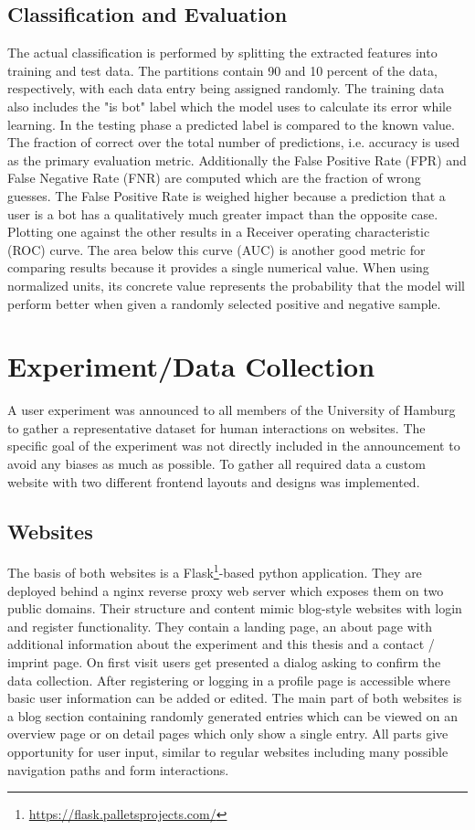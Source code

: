 \documentclass[
    fontsize=12pt,
    headings=small,
    parskip=half,           %
    bibliography=totoc,
    numbers=noenddot,       %
    open=any,               %
    final                   %
]{scrreprt}
\begin{document}
\subsection{Classification and Evaluation}

The actual classification is performed by splitting the extracted features into training and test data. The partitions contain 90 and 10 percent of the data, respectively, with each data entry being assigned randomly. The training data also includes the "is bot" label which the model uses to calculate its error while learning. In the testing phase a predicted label is compared to the known value. The fraction of correct over the total number of predictions, i.e. accuracy is used as the primary evaluation metric. Additionally the False Positive Rate (FPR) and False Negative Rate (FNR) are computed which are the fraction of wrong guesses. The False Positive Rate is weighed higher because a prediction that a user is a bot has a qualitatively much greater impact than the opposite case. Plotting one against the other results in a Receiver operating characteristic (ROC) curve. The area below this curve (AUC) is another good metric for comparing results because it provides a single numerical value. When using normalized units, its concrete value represents the probability that the model will perform better when given a randomly selected positive and negative sample.\cite{FAWCETT2006861}


\section{Experiment/Data Collection}

A user experiment was announced to all members of the University of Hamburg to gather a representative dataset for human interactions on websites. The specific goal of the experiment was not directly included in the announcement to avoid any biases as much as possible. To gather all required data a custom website with two different frontend layouts and designs was implemented.

\subsection{Websites}

The basis of both websites is a Flask\footnote{\url{https://flask.palletsprojects.com/}}-based python application. They are deployed behind a nginx reverse proxy web server which exposes them on two public domains. Their structure and content mimic blog-style websites with login and register functionality. They contain a landing page, an about page with additional information about the experiment and this thesis and a contact / imprint page.
On first visit users get presented a dialog asking to confirm the data collection.
After registering or logging in a profile page is accessible where basic user information can be added or edited. The main part of both websites is a blog section containing randomly generated entries which can be viewed on an overview page or on detail pages which only show a single entry.
All parts give opportunity for user input, similar to regular websites including many possible navigation paths and form interactions.
\end{document}
